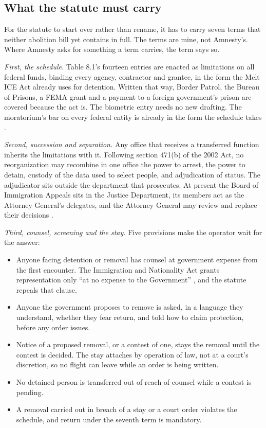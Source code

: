 \subsection{What the statute must carry}
\label{sec:8.4.5}
For the statute to start over rather than rename, it has to carry seven terms that neither abolition bill yet contains in full. The terms are mine, not Amnesty's. Where Amnesty asks for something a term carries, the term says so.

\emph{First, the schedule.} Table 8.1's fourteen entries are enacted as limitations on all federal funds, binding every agency, contractor and grantee, in the form the Melt ICE Act already uses for detention. Written that way, Border Patrol, the Bureau of Prisons, a FEMA grant and a payment to a foreign government's prison are covered because the act is. The biometric entry needs no new drafting. The moratorium's bar on every federal entity is already in the form the schedule takes \autocite{Jayapal2026Moratorium}.

\emph{Second, succession and separation.} Any office that receives a transferred function inherits the limitations with it. Following section 471(b) of the 2002 Act, no reorganization may recombine in one office the power to arrest, the power to detain, custody of the data used to select people, and adjudication of status. The adjudicator sits outside the department that prosecutes. At present the Board of Immigration Appeals sits in the Justice Department, its members act as the Attorney General's delegates, and the Attorney General may review and replace their decisions \autocite{cfr1003_1}.

\emph{Third, counsel, screening and the stay.} Five provisions make the operator wait for the answer:

\begin{itemize}
\item Anyone facing detention or removal has counsel at government expense from the first encounter. The Immigration and Nationality Act grants representation only “at no expense to the Government” \autocite{usc1362}, and the statute repeals that clause.
\item Anyone the government proposes to remove is asked, in a language they understand, whether they fear return, and told how to claim protection, before any order issues.
\item Notice of a proposed removal, or a contest of one, stays the removal until the contest is decided. The stay attaches by operation of law, not at a court's discretion, so no flight can leave while an order is being written.
\item No detained person is transferred out of reach of counsel while a contest is pending.
\item A removal carried out in breach of a stay or a court order violates the schedule, and return under the seventh term is mandatory.
\end{itemize}

